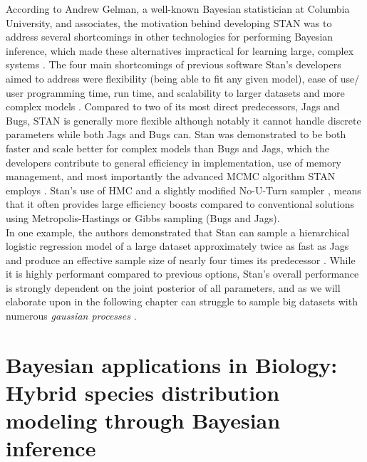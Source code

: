 \documentclass[
  12pt,
]{book}
\theoremstyle{definition}
\theoremstyle{definition}
\theoremstyle{definition}
\theoremstyle{remark}
\begin{document}
According to Andrew Gelman, a well-known Bayesian statistician at Columbia University, and associates, the motivation behind developing STAN was to address several shortcomings in other technologies for performing Bayesian inference, which made these alternatives impractical for learning large, complex systems \citep{Gelman2015}.
The four main shortcomings of previous software Stan's developers aimed to address were flexibility (being able to fit any given model), ease of use/ user programming time, run time, and scalability to larger datasets and more complex models \citep{Gelman2015}.
Compared to two of its most direct predecessors, Jags and Bugs, STAN is generally more flexible although notably it cannot handle discrete parameters while both Jags and Bugs can.
Stan was demonstrated to be both faster and scale better for complex models than Bugs and Jags, which the developers contribute to general efficiency in implementation, use of memory management, and most importantly the advanced MCMC algorithm STAN employs \citep{Gelman2015}.
Stan's use of HMC \citep{Brooks2011} and a slightly modified No-U-Turn sampler \citep{Homan2014}, means that it often provides large efficiency boosts compared to conventional solutions using Metropolis-Hastings or Gibbs sampling (Bugs and Jags).\\
In one example, the authors demonstrated that Stan can sample a hierarchical logistic regression model of a large dataset approximately twice as fast as Jags and produce an effective sample size of nearly four times its predecessor \citep{Gelman2015}.
While it is highly performant compared to previous options, Stan's overall performance is strongly dependent on the joint posterior of all parameters, and as we will elaborate upon in the following chapter can struggle to sample big datasets with numerous \emph{gaussian processes} \citep{Gelman2015}.

\hypertarget{bayesian-applications-in-biology-hybrid-species-distribution-modeling-through-bayesian-inference}{%
\chapter{Bayesian applications in Biology: Hybrid species distribution modeling through Bayesian inference}\label{bayesian-applications-in-biology-hybrid-species-distribution-modeling-through-bayesian-inference}}
\end{document}

